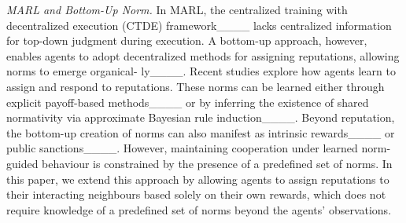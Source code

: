 \textit{MARL and Bottom-Up Norm.} In MARL, the centralized training with decentralized execution (CTDE) framework____ lacks centralized information for top-down judgment during execution. A bottom-up approach, however, enables agents to adopt decentralized methods for assigning reputations, allowing norms to emerge organical- ly____. Recent studies explore how agents learn to assign and respond to reputations. These norms can be learned either through explicit payoff-based methods____ or by inferring the existence of shared normativity via approximate Bayesian rule induction____. Beyond reputation, the bottom-up creation of norms can also manifest as intrinsic rewards____ or public sanctions____. However, maintaining cooperation under learned norm-guided behaviour is constrained by the presence of a predefined set of norms. In this paper, we extend this approach by allowing agents to assign reputations to their interacting neighbours based solely on their own rewards, which does not require knowledge of a predefined set of norms beyond the agents' observations.